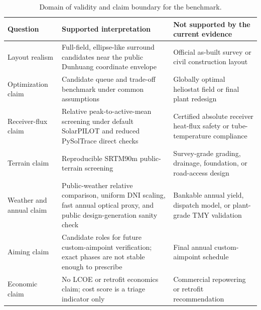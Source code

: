 \documentclass[final,3p,times]{elsarticle}
\begin{document}
\begin{table}[t]
\centering
\caption{Domain of validity and claim boundary for the benchmark.}
\label{tab:domain-validity}
\small
\begin{tabular}{p{}p{}p{}}
\toprule
Question & Supported interpretation & Not supported by the current evidence \\
\midrule
Layout realism & Full-field, ellipse-like surround candidates near the public Dunhuang coordinate envelope & Official as-built survey or civil construction layout \\
Optimization claim & Candidate queue and trade-off benchmark under common assumptions & Globally optimal heliostat field or final plant redesign \\
Receiver-flux claim & Relative peak-to-active-mean screening under default SolarPILOT and reduced PySolTrace direct checks & Certified absolute receiver heat-flux safety or tube-temperature compliance \\
Terrain claim & Reproducible SRTM90m public-terrain screening & Survey-grade grading, drainage, foundation, or road-access design \\
Weather and annual claim & Public-weather relative comparison, uniform DNI scaling, fast annual optical proxy, and public design-generation sanity check & Bankable annual yield, dispatch model, or plant-grade TMY validation \\
Aiming claim & Candidate roles for future custom-aimpoint verification; exact phases are not stable enough to prescribe & Final annual custom-aimpoint schedule \\
Economic claim & No LCOE or retrofit economics claim; cost score is a triage indicator only & Commercial repowering or retrofit recommendation \\
\bottomrule
\end{tabular}
\end{table}
\end{document}
